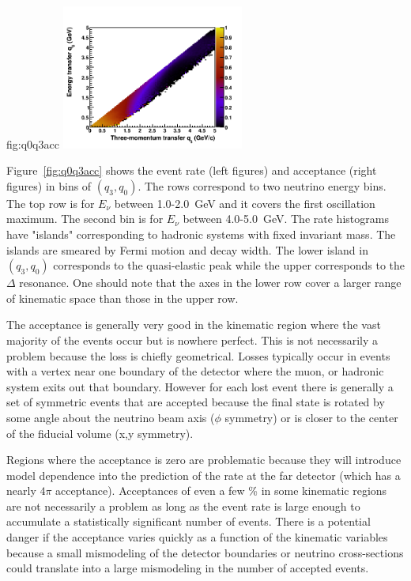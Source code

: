\begin{dunefigure}{fig:q0q3acc}
      \includegraphics[width=0.45\textwidth]{graphics/eff_q0q3_Ev_4000_5000.png}
\end{dunefigure}

Figure~\ref{fig:q0q3acc} shows the event rate (left figures) and acceptance (right figures) in bins of $(q_3,q_0)$. The rows correspond to two neutrino energy bins. The top row is for $E_\nu$ between \num{1.0}-\SI{2.0}{GeV} and it covers the first oscillation maximum. The second bin is for $E_\nu$ between \num{4.0}-\SI{5.0}{GeV}.  The rate histograms have "islands" corresponding to hadronic systems with fixed invariant mass. The islands are smeared by Fermi motion and decay width. The lower island in $(q_3,q_0)$ corresponds to the quasi-elastic peak while the upper corresponds to the $\Delta$ resonance. One should note that the axes in the lower row cover a larger range of kinematic space than those in the upper row. 

The acceptance is generally very good in the kinematic region where the vast majority of the events occur but is nowhere perfect. This is not necessarily a problem because the loss is chiefly geometrical. Losses typically occur in events with a vertex near one boundary of the detector where the muon, or hadronic system exits out that boundary.  However for each lost event there is generally a set of symmetric events that are accepted because the final state is rotated by some angle about the neutrino beam axis ($\phi$ symmetry) or is closer to the center of the fiducial volume (x,y symmetry).

Regions where the acceptance is zero are problematic because they will introduce model dependence into the prediction of the rate at the far detector (which has a nearly $4\pi$ acceptance). Acceptances of even a few \% in some kinematic regions are not necessarily a problem as long as the event rate is large enough to accumulate a statistically significant number of events. %
There is a potential danger if the acceptance varies quickly as a function of the kinematic variables because a small mismodeling of the detector boundaries or neutrino cross-sections could translate into a large mismodeling in the number of accepted events. 

